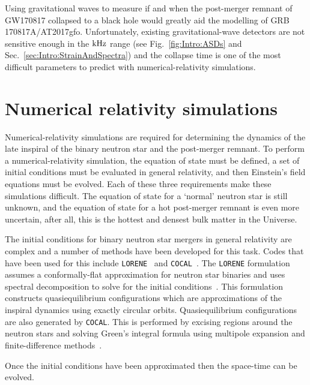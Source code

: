 \documentclass[../Thesis.tex]{subfiles}
\begin{document}
    Using gravitational waves to measure if and when the post-merger remnant of GW170817 collapsed to a black hole would greatly aid the modelling of GRB 170817A/AT2017gfo.
    Unfortunately, existing gravitational-wave detectors are not sensitive enough in the $\mathrm{kHz}$ range (see Fig.~\ref{fig:Intro:ASDs} and Sec.~\ref{sec:Intro:StrainAndSpectra}) and the collapse time is one of the most difficult parameters to predict with numerical-relativity simulations.


    \section{Numerical relativity simulations}

    
    Numerical-relativity simulations are required for determining the dynamics of the late inspiral of the binary neutron star and the post-merger remnant.
    To perform a numerical-relativity simulation, the equation of state must be defined, a set of initial conditions must be evaluated in general relativity, and then Einstein's field equations must be evolved.
    Each of these three requirements make these simulations difficult.
    The equation of state for a `normal' neutron star is still unknown, and the equation of state for a hot post-merger remnant is even more uncertain, after all, this is the hottest and densest bulk matter in the Universe.

    
    
    
    
    \par
 
    The initial conditions for binary neutron star mergers in general relativity are complex and a number of methods have been developed for this task.
    Codes that have been used for this include \texttt{LORENE}~\cite{Gourgoulhon2001} and \texttt{COCAL}~\cite{Tsokaros2015}.
    The \texttt{LORENE} formulation assumes a conformally-flat approximation for  neutron star binaries and uses spectral decomposition to solve for the initial conditions~\cite{Gourgoulhon2001}.
    This formulation constructs quasiequilibrium configurations which are approximations of the inspiral dynamics using exactly circular orbits.
    Quasiequilibrium configurations are also generated by \texttt{COCAL}.
    This is performed by excising regions around the neutron stars and solving Green's integral formula using multipole expansion and finite-difference methods~\cite{Uryu2012,Tsokaros2015}.

    Once the initial conditions have been approximated then the space-time can be evolved.
\end{document}
